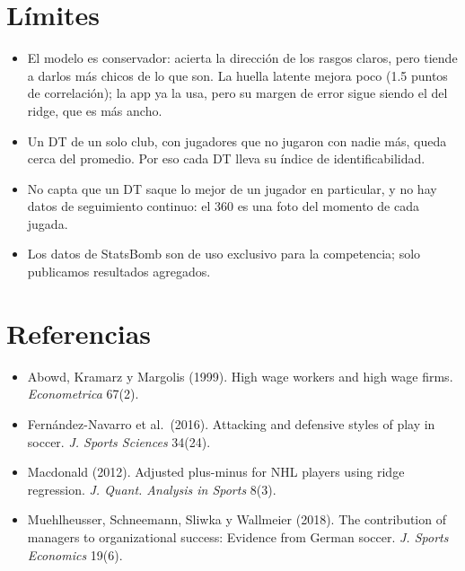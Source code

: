 \documentclass[10pt,a4paper,twocolumn]{article}
\begin{document}
\section{Límites}
\begin{itemize}
\item El modelo es conservador: acierta la dirección de los rasgos claros, pero tiende a darlos más chicos de lo que son. La huella latente mejora poco (1.5 puntos de correlación); la app ya la usa, pero su margen de error sigue siendo el del ridge, que es más ancho.
\item Un DT de un solo club, con jugadores que no jugaron con nadie más, queda cerca del promedio. Por eso cada DT lleva su índice de identificabilidad.
\item No capta que un DT saque lo mejor de un jugador en particular, y no hay datos de seguimiento continuo: el 360 es una foto del momento de cada jugada.
\item Los datos de StatsBomb son de uso exclusivo para la competencia; solo publicamos resultados agregados.
\end{itemize}

\section*{Referencias}
\footnotesize
\begin{itemize}[leftmargin=0pt, label={}, itemsep=2pt]
\item Abowd, Kramarz y Margolis (1999). High wage workers and high wage firms. \emph{Econometrica} 67(2).
\item Fernández-Navarro et al.\ (2016). Attacking and defensive styles of play in soccer. \emph{J. Sports Sciences} 34(24).
\item Macdonald (2012). Adjusted plus-minus for NHL players using ridge regression. \emph{J. Quant. Analysis in Sports} 8(3).
\item Muehlheusser, Schneemann, Sliwka y Wallmeier (2018). The contribution of managers to organizational success: Evidence from German soccer. \emph{J. Sports Economics} 19(6).
\end{itemize}
\end{document}
